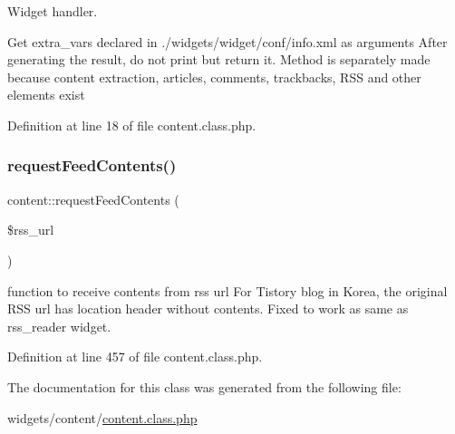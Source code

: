 Widget handler. 

Get extra\+\_\+vars declared in ./widgets/widget/conf/info.xml as arguments After generating the result, do not print but return it. Method is separately made because content extraction, articles, comments, trackbacks, R\+SS and other elements exist

Definition at line 18 of file content.\+class.\+php.

\hypertarget{classcontent_a6f9991d17df1b915196ca159512552a1}{}\label{classcontent_a6f9991d17df1b915196ca159512552a1} 
\subsubsection{\texorpdfstring{request\+Feed\+Contents()}{requestFeedContents()}}
{\footnotesize\ttfamily content\+::request\+Feed\+Contents (\begin{DoxyParamCaption}\item[{}]{\$rss\+\_\+url }\end{DoxyParamCaption})}



function to receive contents from rss url For Tistory blog in Korea, the original R\+SS url has location header without contents. Fixed to work as same as rss\+\_\+reader widget. 



Definition at line 457 of file content.\+class.\+php.



The documentation for this class was generated from the following file\+:\begin{DoxyCompactItemize}
\item 
widgets/content/\hyperlink{content_8class_8php}{content.\+class.\+php}\end{DoxyCompactItemize}
